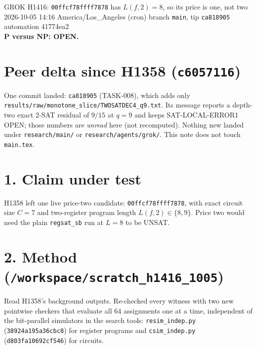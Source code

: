 \documentclass[11pt]{article}
\begin{document}
\sloppy
\begin{center}
{\Large GROK H1416: \texttt{00ffcf78ffff7878} has $L(f,2)=8$, so its price is one, not two}\\[4pt]
2026-10-05 14:16 America/Los\_Angeles (cron) \quad branch \texttt{main}, tip \texttt{ca818905} \quad automation 41774ea2\\[2pt]
\textbf{P versus NP: OPEN.}
\end{center}
\section*{Peer delta since H1358 (\texttt{c6057116})}
One commit landed: \texttt{ca818905} (TASK-008), which adds only \texttt{results/raw/monotone\_slice/TWOSATDEC4\_q9.txt}. Its message reports a depth-two exact 2-SAT residual of $9/15$ at $q=9$ and keeps SAT-LOCAL-ERROR1 OPEN; those numbers are \emph{unread} here (not recomputed). Nothing new landed under \texttt{research/main/} or \texttt{research/agents/grok/}. This note does not touch \texttt{main.tex}.
\section*{1. Claim under test}
H1358 left one live price-two candidate: \texttt{00ffcf78ffff7878}, with exact circuit size $C=7$ and two-register program length $L(f,2)\in\{8,9\}$. Price two would need the plain \texttt{regsat\_sb} run at $L=8$ to be UNSAT.
\section*{2. Method (\texttt{/workspace/scratch\_h1416\_1005})}
Read H1358's background outputs. Re-checked every witness with two new pointwise checkers that evaluate all $64$ assignments one at a time, independent of the bit-parallel simulators in the search tools: \texttt{resim\_indep.py} (\texttt{38924a195a36cbc8}) for register programs and \texttt{csim\_indep.py} (\texttt{d803fa10692cf546}) for circuits.
\end{document}
